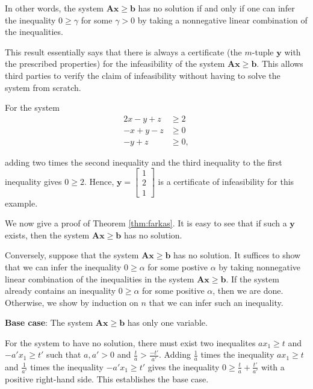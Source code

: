 \documentclass[]{book}
\def\gt{>}
\newcommand{\mm}[1]{\mathbf{#1}}
\renewcommand{\vec}[1]{\mathbf{#1}}
\theoremstyle{definition}
\theoremstyle{definition}
\theoremstyle{remark}
\let\BeginKnitrBlock\begin \let\EndKnitrBlock\end
\begin{document}
In other words, the system \(\mm{A}\vec{x} \geq \vec{b}\) has no
solution if and only if one can infer the inequality \(0 \geq \gamma\)
for some \(\gamma \gt 0\) by taking a nonnegative linear combination of
the inequalities.

This result essentially says that there is always a certificate (the
\(m\)-tuple \(\vec{y}\) with the prescribed properties) for the
infeasibility of the system \(\mm{A}\vec{x} \geq \vec{b}\). This allows
third parties to verify the claim of infeasibility without having to
solve the system from scratch.

\BeginKnitrBlock{example}
\protect\hypertarget{ex:unnamed-chunk-2}{}{\label{ex:unnamed-chunk-2}} For
the system
\begin{align*}
2x - y + z & \geq 2 \\
-x + y - z & \geq 0 \\
   - y + z & \geq 0,
\end{align*}

adding two times the second inequality and the third inequality to the
first inequality gives \(0 \geq 2\). Hence,
\(\vec{y} = \begin{bmatrix} 1\\ 2 \\ 1\end{bmatrix}\) is a certificate
of infeasibility for this example.
\EndKnitrBlock{example}

We now give a proof of Theorem \ref{thm:farkas}. It is easy to see that
if such a \(\vec{y}\) exists, then the system
\(\mm{A}\vec{x} \geq \vec{b}\) has no solution.

Conversely, suppose that the system \(\mm{A}\vec{x} \geq \vec{b}\) has
no solution. It suffices to show that we can infer the inequality
\(0 \geq \alpha\) for some postive \(\alpha\) by taking nonnegative
linear combination of the inequalities in the system
\(\mm{A}\vec{x} \geq \vec{b}\). If the system already contains an
inequality \(0 \geq \alpha\) for some positive \(\alpha\), then we are
done. Otherwise, we show by induction on \(n\) that we can infer such an
inequality.

\textbf{Base case}: The system \(\mm{A}\vec{x} \geq \vec{b}\) has only
one variable.

For the system to have no solution, there must exist two inequalites
\(ax_1 \geq t\) and \(-a'x_1 \geq t'\) such that \(a, a' \gt 0\) and
\(\frac{t}{a} \gt \frac{-t'}{a'}\). Adding \(\frac{1}{a}\) times the
inequality \(ax_1 \geq t\) and \(\frac{1}{a'}\) times the inequality
\(-a'x_1 \geq t'\) gives the inequality
\(0 \geq \frac{t}{a} + \frac{t'}{a'}\) with a positive right-hand side.
This establishes the base case.
\end{document}
